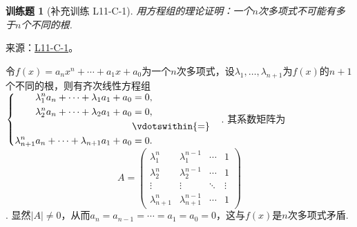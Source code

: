 \documentclass[12pt,fontset=fandol]{ctexart}
\newtheorem{exercise}{训练题}[section]
\begin{document}
\begin{exercise}[补充训练 L11-C-1]\label{prob:L11-C-1}
用方程组的理论证明：一个$n$次多项式不可能有多于$n$个不同的根.
\end{exercise}
\noindent 来源：\href{https://github.com/yhwu-is/Linear-Algebra-Left-Undone/blob/new/%E8%AE%B2%E4%B9%89/%E4%B8%93%E9%A2%98/11%20%E6%9C%9D%E8%8A%B1%E5%A4%95%E6%8B%BE.tex}{L11-C-1}。
\begin{solve}
令$f(x)=a_nx^n+\cdots+a_1x+a_0$为一个$n$次多项式，设$\lambda_1,\ldots,\lambda_{n+1}$为$f(x)$的$n+1$个不同的根，则有齐次线性方程组$\begin{cases} \begin{aligned}
                \lambda_1^n a_n+\cdots+\lambda_1a_1+a_0         & =0,               \\
                \lambda_2^n a_n+\cdots+\lambda_2a_1+a_0         & =0,               \\
                                                                & \vdotswithin{ = } \\
                \lambda_{n+1}^n a_n+\cdots+\lambda_{n+1}a_1+a_0 & =0.
            \end{aligned} \end{cases}$. 其系数矩阵为
\[A=\begin{pmatrix}
            \lambda_1^n     & \lambda_1^{n-1}     & \cdots & 1      \\
            \lambda_2^n     & \lambda_2^{n-1}     & \cdots & 1      \\
            \vdots          & \vdots              & \ddots & \vdots \\
            \lambda_{n+1}^n & \lambda_{n+1}^{n-1} & \cdots & 1
        \end{pmatrix}\]
. 显然$|A|\neq 0$，从而$a_n=a_{n-1}=\cdots=a_1=a_0=0$，这与$f(x)$是$n$次多项式矛盾.
\end{solve}
\end{document}
